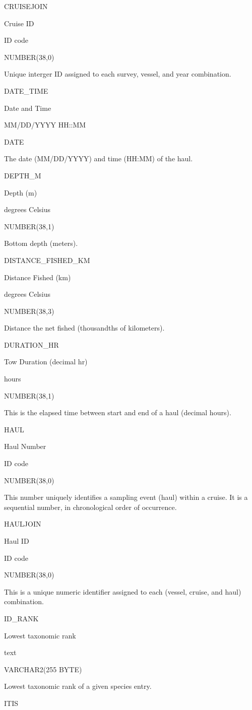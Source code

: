 \documentclass[
  letterpaper,
  oneside,
  open=any]{scrbook}
\begin{document}
CRUISEJOIN

Cruise ID

ID code

NUMBER(38,0)

Unique interger ID assigned to each survey, vessel, and year
combination.

DATE\_TIME

Date and Time

MM/DD/YYYY HH::MM

DATE

The date (MM/DD/YYYY) and time (HH:MM) of the haul.

DEPTH\_M

Depth (m)

degrees Celsius

NUMBER(38,1)

Bottom depth (meters).

DISTANCE\_FISHED\_KM

Distance Fished (km)

degrees Celsius

NUMBER(38,3)

Distance the net fished (thousandths of kilometers).

DURATION\_HR

Tow Duration (decimal hr)

hours

NUMBER(38,1)

This is the elapsed time between start and end of a haul (decimal
hours).

HAUL

Haul Number

ID code

NUMBER(38,0)

This number uniquely identifies a sampling event (haul) within a cruise.
It is a sequential number, in chronological order of occurrence.

HAULJOIN

Haul ID

ID code

NUMBER(38,0)

This is a unique numeric identifier assigned to each (vessel, cruise,
and haul) combination.

ID\_RANK

Lowest taxonomic rank

text

VARCHAR2(255 BYTE)

Lowest taxonomic rank of a given species entry.

ITIS
\end{document}
